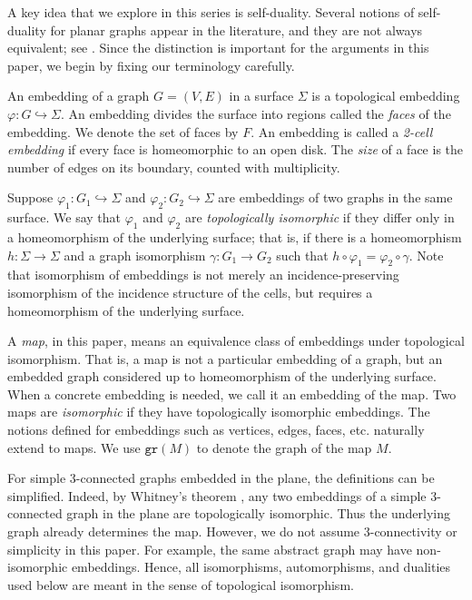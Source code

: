 \documentclass{article}
\newcommand{\gr}{\mathtt{gr}}
\begin{document}
A key idea that we explore in this series is self-duality. 
Several notions of self-duality for planar graphs appear in the literature, and they are not always equivalent; see \cite{servatius1996selfdual}. Since the distinction is important for the arguments in this paper, we begin by fixing our terminology carefully.


An embedding of a graph $G=(V,E)$ in a surface $\Sigma$ is a topological embedding $\varphi: G \hookrightarrow \Sigma$. An embedding divides the surface into regions called the \emph{faces} of the embedding. We denote the set of faces by $F$. An embedding is called a \emph{2-cell embedding} if every face is homeomorphic to an open disk. The \emph{size} of a face is the number of edges on its boundary, counted with multiplicity. 


 
 Suppose $\varphi_1:G_1\hookrightarrow \Sigma$  and $\varphi_2:G_2\hookrightarrow \Sigma$ are embeddings of two graphs in the same surface. We say that $\varphi_1$ and $\varphi_2$ are  \emph{topologically isomorphic} if they differ only in a homeomorphism of the underlying surface; that is, if there is a homeomorphism $h:\Sigma\rightarrow \Sigma$ and a graph isomorphism $\gamma:G_1\rightarrow G_2$ such that $h\circ\varphi_1 =\varphi_2\circ\gamma$. Note that isomorphism of embeddings is not merely an incidence-preserving isomorphism of the incidence structure of the cells, but requires a homeomorphism of the underlying surface.

 A \emph{map}, in this paper, means an equivalence class of embeddings under topological isomorphism. That is, a map is not a particular embedding of a graph, but an embedded graph considered up to homeomorphism of the underlying surface. When a concrete embedding is needed, we call it an embedding of the map. Two maps are \emph{isomorphic} if they have topologically isomorphic embeddings. The notions defined for embeddings such as  vertices, edges, faces, etc. naturally extend to maps.  We use $\gr(M)$ to denote the graph of the map $M$.


For simple 3-connected graphs embedded in the plane, the definitions can be simplified. Indeed, by Whitney's theorem \cite{whitney19332}, any two embeddings of a simple 3-connected graph in the plane are topologically isomorphic. Thus the underlying graph already determines the map.  
However, we do not assume 3-connectivity or simplicity in this paper. For example, the same abstract graph may have non-isomorphic embeddings. Hence, all isomorphisms, automorphisms, and dualities used below are meant in the sense of topological isomorphism.
\end{document}

